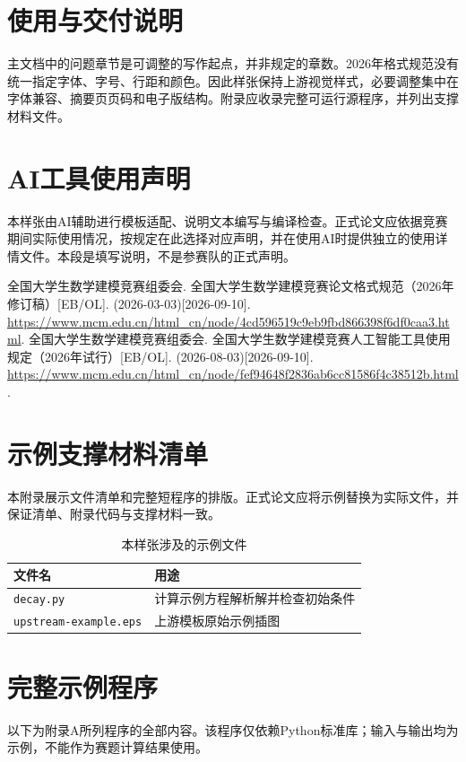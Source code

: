 \documentclass[withoutpreface,notoc,bwprint]{cumcmthesis}
\begin{document}
\section{使用与交付说明}
主文档中的问题章节是可调整的写作起点，并非规定的章数。2026年格式规范没有统一指定字体、字号、行距和颜色\cite{format2026}。因此样张保持上游视觉样式，必要调整集中在字体兼容、摘要页页码和电子版结构。附录应收录完整可运行源程序，并列出支撑材料文件。

\section*{AI工具使用声明}
本样张由AI辅助进行模板适配、说明文本编写与编译检查。正式论文应依据竞赛期间实际使用情况，按规定在此选择对应声明，并在使用AI时提供独立的使用详情文件\cite{ai2026}。本段是填写说明，不是参赛队的正式声明。

\begin{thebibliography}{9}
 全国大学生数学建模竞赛组委会. 全国大学生数学建模竞赛论文格式规范（2026年修订稿）[EB/OL]. (2026-03-03)[2026-09-10]. \url{https://www.mcm.edu.cn/html_cn/node/4cd596519c9eb9fbd866398f6df0caa3.html}.
 全国大学生数学建模竞赛组委会. 全国大学生数学建模竞赛人工智能工具使用规定（2026年试行）[EB/OL]. (2026-08-03)[2026-09-10]. \url{https://www.mcm.edu.cn/html_cn/node/fef94648f2836ab6cc81586f4c38512b.html}.
\end{thebibliography}
\clearpage
\begin{appendices}
\section{示例支撑材料清单}
本附录展示文件清单和完整短程序的排版。正式论文应将示例替换为实际文件，并保证清单、附录代码与支撑材料一致。
\begin{table}[htbp]
\centering
\caption{本样张涉及的示例文件}
\begin{tabularx}{\textwidth}{LL}
\toprule
文件名 & 用途\\
\midrule
\texttt{decay.py} & 计算示例方程解析解并检查初始条件\\
\texttt{upstream-example.eps} & 上游模板原始示例插图\\
\bottomrule
\end{tabularx}
\end{table}
\section{完整示例程序}
以下为附录A所列程序的全部内容。该程序仅依赖Python标准库；输入与输出均为示例，不能作为赛题计算结果使用。

\end{appendices}
\end{document}
